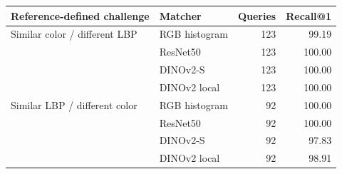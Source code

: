 \begin{tabular}{llrr}
\toprule
Reference-defined challenge & Matcher & Queries & Recall@1 \\
\midrule
Similar color / different LBP & RGB histogram & 123 & 99.19 \\
 & ResNet50 & 123 & 100.00 \\
 & DINOv2-S & 123 & 100.00 \\
 & DINOv2 local & 123 & 100.00 \\
Similar LBP / different color & RGB histogram & 92 & 100.00 \\
 & ResNet50 & 92 & 100.00 \\
 & DINOv2-S & 92 & 97.83 \\
 & DINOv2 local & 92 & 98.91 \\
\bottomrule
\end{tabular}
